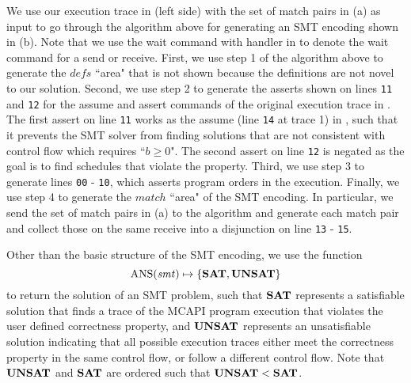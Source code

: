 We use our execution trace in  (left side) with the set of match pairs in (a) as input to go through the algorithm above for generating an SMT encoding shown in (b). Note that we use the wait command with handler in  to denote the wait command for a send or receive. First, we use step 1 of the algorithm above to generate the $\mathit{defs}$ ``area" that is not shown because the definitions are not novel to our solution. Second, we use step 2 to generate the asserts shown on lines \texttt{11} and \texttt{12} for the assume and assert commands of the original execution trace in . The first assert on line \texttt{11} works as the assume (line \texttt{14} at trace 1) in , such that it prevents the SMT solver from finding solutions that are not consistent with control flow which requires ``$b \ge 0$". The second assert on line \texttt{12} is negated as the goal is to find schedules that violate the property. Third, we use step 3 to generate lines \texttt{00} - \texttt{10}, which asserts program orders in the execution. Finally, we use step 4 to generate the $\mathit{match}$ ``area" of the SMT encoding. In particular, we send the set of match pairs in (a) to the algorithm and generate each match pair and collect those on the same receive into a disjunction on line \texttt{13} - \texttt{15}.

Other than the basic structure of the SMT encoding, we use the function
\[\mathrm{ANS}(\mathit{smt}) \mapsto \{\mathrm{\textbf{SAT}},\mathrm{\textbf{UNSAT}}\} \]
to return the solution of an SMT problem, such that $\mathrm{\textbf{SAT}}$ represents a satisfiable solution that finds a trace of the MCAPI program execution that violates the user defined correctness property, and $\mathrm{\textbf{UNSAT}}$ represents an unsatisfiable solution indicating that all possible execution traces either meet the correctness property in the same control flow, or follow a different control flow. Note that $\mathrm{\textbf{UNSAT}}$ and $\mathrm{\textbf{SAT}}$ are ordered such that $\mathrm{\textbf{UNSAT}} < \mathrm{\textbf{SAT}}$.

